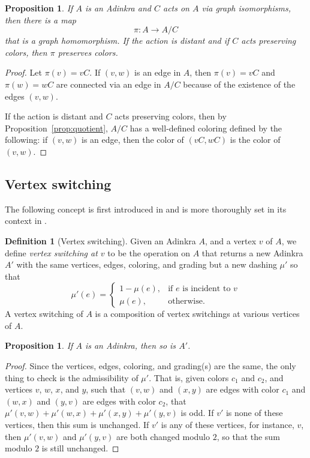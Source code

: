 \documentclass[12pt,twoside,singlespace]{article}
\numberwithin{equation}{section}
\newtheorem{prop}[equation]{Proposition}
\theoremstyle{definition}
\newtheorem{definition}[equation]{Definition}
\begin{document}
\begin{prop}
If $A$ is an Adinkra and $C$ acts on $A$ via graph isomorphisms, then there is a map
\[\pi:A\to A/C\]
 that is a graph homomorphism.  If the action is distant and if $C$ acts preserving colors, then $\pi$ preserves colors.
\end{prop}
\begin{proof}
Let $\pi(v)=vC$.  If $(v,w)$ is an edge in $A$, then $\pi(v)=vC$ and $\pi(w)=wC$ are connected via an edge in $A/C$ because of the existence of the edges $(v,w)$.

If the action is distant and $C$ acts preserving colors, then by Proposition~\ref{prop:quotient}, $A/C$ has a well-defined coloring defined by the following: if $(v,w)$ is an edge, then the color of $(vC,wC)$ is the color of $(v,w)$.
\end{proof}




\subsection{Vertex switching}
The following concept is first introduced in \cite{} and is more thoroughly set in its context in \cite{Yan,cubicalcohomology}.

\begin{definition}[Vertex switching]
Given an Adinkra $A$, and a vertex $v$ of $A$, we define \emph{vertex switching at $v$} to be the operation on $A$ that returns a new Adinkra $A'$ with the same vertices, edges, coloring, and grading but a new dashing $\mu'$ so that
\begin{equation}
\mu'(e)=\begin{cases}
1-\mu(e),&\mbox{if $e$ is incident to $v$}\\
\mu(e),&\mbox{otherwise.}
\end{cases}
\end{equation}
A vertex switching of $A$ is a composition of vertex switchings at various vertices of $A$.
\end{definition}

\begin{prop}
\label{prop:switching-still-adinkra}
If $A$ is an Adinkra, then so is $A'$.
\end{prop}
\begin{proof}
Since the vertices, edges, coloring, and grading(s) are the same, the only thing to check is the admissibility of $\mu'$.  That is, given colors $c_1$ and $c_2$, and vertices $v$, $w$, $x$, and $y$, such that $(v,w)$ and $(x,y)$ are edges with color $c_1$ and $(w,x)$ and $(y,v)$ are edges with color $c_2$, that $\mu'(v,w)+\mu'(w,x)+\mu'(x,y)+\mu'(y,v)$ is odd.  If $v'$ is none of these vertices, then this sum is unchanged.  If $v'$ is any of these vertices, for instance, $v$, then $\mu'(v,w)$ and $\mu'(y,v)$ are both changed modulo $2$, so that the sum modulo $2$ is still unchanged.
\end{proof}
\end{document}
